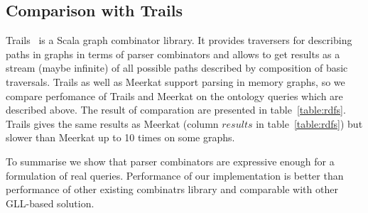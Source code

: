 \subsection{Comparison with Trails}

Trails~\cite{ScalaGraphParsing} is a Scala graph combinator library.
It provides traversers for describing paths in graphs in terms of parser combinators and allows to get results as a stream (maybe infinite) of all possible paths described by composition of basic traversals.
Trails as well as Meerkat support parsing in memory graphs, so we compare perfomance of Trails and Meerkat on the ontology queries which are described above.
The result of comparation are presented in table~\ref{table:rdfs}.
Trails gives the same results as Meerkat (column $results$ in table~\ref{table:rdfs}) but slower than Meerkat up to 10 times on some graphs.

To summarise we show that parser combinators are expressive enough for a formulation of real queries.
Performance of our implementation is better than performance of other existing combinatrs library and comparable with other GLL-based solution.

